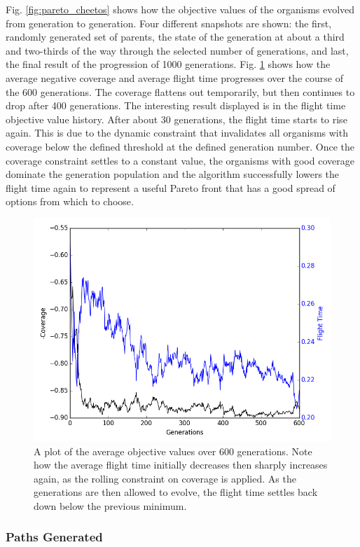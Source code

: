 \documentclass[letterpaper, 10 pt, conference]{ieeeconf}  %
\begin{document}
Fig. \ref{fig:pareto_cheetos} shows how the objective values of the organisms evolved from generation to generation. Four different snapshots are shown: the first, randomly generated set of parents, the state of the generation at about a third and two-thirds of the way through the selected number of generations, and last, the final result of the progression of 1000 generations. Fig. \ref{fig:objectives} shows how the average negative coverage and average flight time progresses over the course of the 600 generations. The coverage flattens out temporarily, but then continues to drop after 400 generations. The interesting result displayed is in the flight time objective value history. After about 30 generations, the flight time starts to rise again. This is due to the dynamic constraint that invalidates all organisms with coverage below the defined threshold at the defined generation number. Once the coverage constraint settles to a constant value, the organisms with good coverage dominate the generation population and the algorithm successfully lowers the flight time again to represent a useful Pareto front that has a good spread of options from which to choose.

\begin{figure}
\centering
\includegraphics[width=0.8\linewidth]{figures/fitness.png}
\caption{A plot of the average objective values over 600 generations. Note how the average flight time initially decreases then sharply increases again, as the rolling constraint on coverage is applied. As the generations are then allowed to evolve, the flight time settles back down below the previous minimum.}
\label{fig:objectives}
\end{figure}

\subsubsection{Paths Generated}
\end{document}
